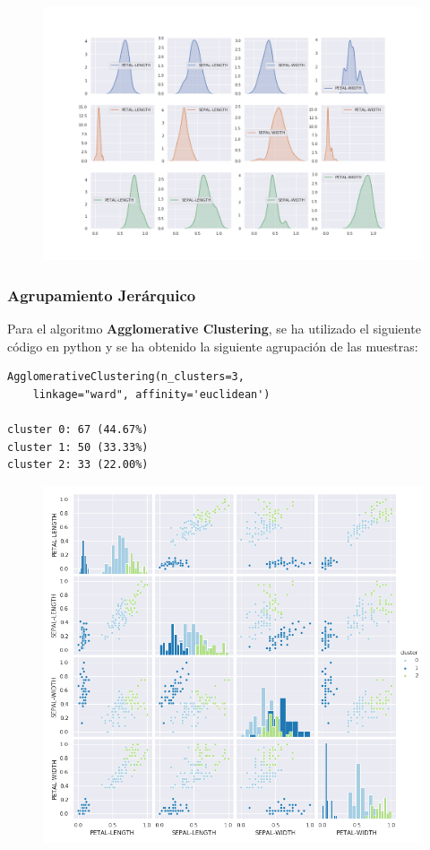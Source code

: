 \documentclass[spanish]{beamer}
\begin{document}
\begin{frame}
\begin{figure}[h]
\centering
\includegraphics[scale=0.29]{dani/kdeplotK-MeansIRIS.png}
\end{figure}
\end{frame}

\begin{frame}[fragile]
\frametitle{Agrupamiento Jerárquico}
Para el algoritmo \textbf{Agglomerative Clustering}, se ha utilizado el siguiente código en python y se ha obtenido la siguiente agrupación de las muestras:\break
\begin{lstlisting}
AgglomerativeClustering(n_clusters=3, 
	linkage="ward", affinity='euclidean')

cluster 0: 67 (44.67%)
cluster 1: 50 (33.33%)
cluster 2: 33 (22.00%)
\end{lstlisting}
\end{frame}

\begin{frame}
\begin{figure}[h]
\centering
\includegraphics[scale=0.34]{dani/scatmatrixAggClusterIRIS.png}
\end{figure}
\end{frame}
\end{document}

